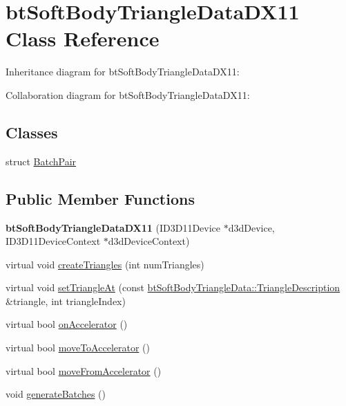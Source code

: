 \hypertarget{classbt_soft_body_triangle_data_d_x11}{\section{bt\+Soft\+Body\+Triangle\+Data\+D\+X11 Class Reference}
\label{classbt_soft_body_triangle_data_d_x11}
}


Inheritance diagram for bt\+Soft\+Body\+Triangle\+Data\+D\+X11\+:


Collaboration diagram for bt\+Soft\+Body\+Triangle\+Data\+D\+X11\+:
\subsection*{Classes}
\begin{DoxyCompactItemize}
\item 
struct \hyperlink{structbt_soft_body_triangle_data_d_x11_1_1_batch_pair}{Batch\+Pair}
\end{DoxyCompactItemize}
\subsection*{Public Member Functions}
\begin{DoxyCompactItemize}
\item 
\hypertarget{classbt_soft_body_triangle_data_d_x11_a5b20fa5df829cbd5f3894103975c5327}{{\bfseries bt\+Soft\+Body\+Triangle\+Data\+D\+X11} (I\+D3\+D11\+Device $\ast$d3d\+Device, I\+D3\+D11\+Device\+Context $\ast$d3d\+Device\+Context)}\label{classbt_soft_body_triangle_data_d_x11_a5b20fa5df829cbd5f3894103975c5327}

\item 
virtual void \hyperlink{classbt_soft_body_triangle_data_d_x11_a91fd155f00fac9ce8330f62b5fd4a26b}{create\+Triangles} (int num\+Triangles)
\item 
virtual void \hyperlink{classbt_soft_body_triangle_data_d_x11_a134859f4ca5a7c32109b06651e8939a8}{set\+Triangle\+At} (const \hyperlink{classbt_soft_body_triangle_data_1_1_triangle_description}{bt\+Soft\+Body\+Triangle\+Data\+::\+Triangle\+Description} \&triangle, int triangle\+Index)
\item 
virtual bool \hyperlink{classbt_soft_body_triangle_data_d_x11_ae1dc56ae7688b61b271f2213296caf19}{on\+Accelerator} ()
\item 
virtual bool \hyperlink{classbt_soft_body_triangle_data_d_x11_aa3d2af489f6521cdd95c152f49fcedff}{move\+To\+Accelerator} ()
\item 
virtual bool \hyperlink{classbt_soft_body_triangle_data_d_x11_aeef8543b31e4ee314e7fdf971197276c}{move\+From\+Accelerator} ()
\item 
void \hyperlink{classbt_soft_body_triangle_data_d_x11_af95827e1a6ec034b8fcca098eedc1026}{generate\+Batches} ()
\end{DoxyCompactItemize}
